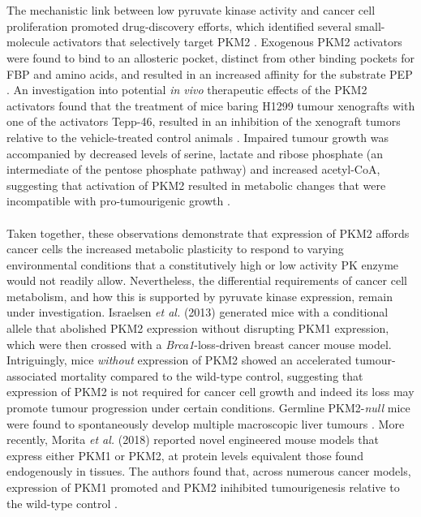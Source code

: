 %
%
\\\\
%
%
The mechanistic link between low pyruvate kinase activity and cancer cell proliferation promoted drug-discovery efforts, which identified several small-molecule activators that selectively target PKM2 \cite{Boxer:2010aa,Jiang:2010aa,Walsh:2011aa}. Exogenous PKM2 activators were found to bind to an allosteric pocket, distinct from other binding pockets for FBP and amino acids, and resulted in an increased affinity for the substrate PEP \cite{Anastasiou:2012aa}. An investigation into potential \textit{in vivo} therapeutic effects of the PKM2 activators found that the treatment of mice baring H1299 tumour xenografts with one of the activators Tepp-46, resulted in an inhibition of the xenograft tumors relative to the vehicle-treated control animals \cite{Anastasiou:2012aa}. Impaired tumour growth was accompanied by decreased levels of serine, lactate and ribose phosphate (an intermediate of the pentose phosphate pathway) and increased acetyl-CoA, suggesting that activation of PKM2 resulted in metabolic changes that were incompatible with pro-tumourigenic growth \cite{Anastasiou:2012aa,Kung:2012aa}.
%
%
\\\\
%
%
Taken together, these observations demonstrate that expression of PKM2 affords cancer cells the increased metabolic plasticity to respond to varying environmental conditions that a constitutively high or low activity PK enzyme would not readily allow. Nevertheless, the differential requirements of cancer cell metabolism, and how this is supported by pyruvate kinase expression, remain under investigation. Israelsen \textit{et al.} (2013) \cite{Israelsen:2013aa} generated mice with a conditional allele that abolished PKM2 expression without disrupting PKM1 expression, which were then crossed with a \textit{Brca1}-loss-driven breast cancer mouse model. Intriguingly, mice \textit{without} expression of PKM2 showed an accelerated tumour-associated mortality compared to the wild-type control, suggesting that expression of PKM2 is not required for cancer cell growth and indeed its loss may promote tumour progression under certain conditions. Germline PKM2-\textit{null} mice were found to spontaneously develop multiple macroscopic liver tumours \cite{Dayton:2016aa}. More recently, Morita \textit{et al.} (2018) \cite{Morita:2018aa} reported novel engineered mouse models that express either PKM1 or PKM2, at protein levels equivalent those found endogenously in tissues. The authors found that, across numerous cancer models, expression of PKM1 promoted and PKM2 inihibited tumourigenesis relative to the wild-type control \cite{Morita:2018aa}. 
